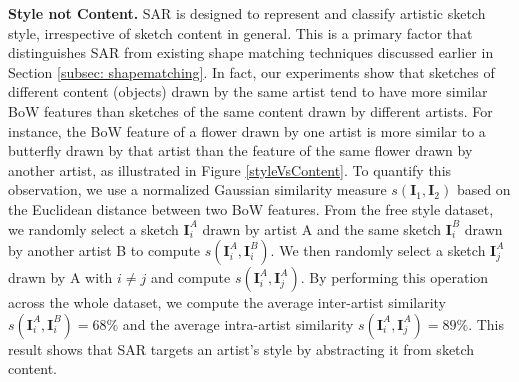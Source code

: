 \noindent\textbf{Style not Content.} SAR is designed to represent and classify artistic sketch style, irrespective of sketch content in general. This is a primary factor that distinguishes SAR from existing shape matching techniques discussed earlier in Section \ref{subsec: shapematching}. In fact, our experiments show that sketches of different content (objects) drawn by the same artist tend to have more similar BoW features than sketches of the same content drawn by different artists. For instance, the BoW feature of a flower drawn by one artist is more similar to a butterfly drawn by that artist than the feature of the same flower drawn by another artist, as illustrated in Figure \ref{styleVsContent}. To quantify this observation, we use a normalized Gaussian similarity measure $s(\mathbf{I}_1,\mathbf{I}_2)$ based on the Euclidean distance between two BoW features. From the free style dataset, we randomly select a sketch $\mathbf{I}_i^A$ drawn by artist A and the same sketch $\mathbf{I}_i^B$  drawn by another artist B to compute $s(\mathbf{I}_i^A,\mathbf{I}_i^B)$. We then randomly select a sketch $\mathbf{I}_j^A$ drawn by A with $i\neq j$ and compute $s(\mathbf{I}_i^A,\mathbf{I}_j^A)$. By performing this operation across the whole dataset, we compute the average inter-artist similarity $s(\mathbf{I}_i^A,\mathbf{I}_i^B)=68\%$ and the average intra-artist similarity $s(\mathbf{I}_i^A,\mathbf{I}_j^A)=89\%$.  This result shows that SAR targets an artist's style by abstracting it from sketch content.





